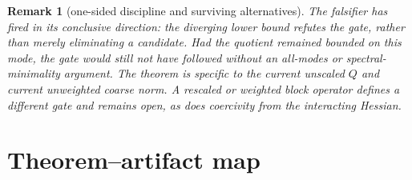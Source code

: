 \documentclass[11pt]{article}
\newtheorem{remark}[theorem]{Remark}
\theoremstyle{definition}
\begin{document}
\begin{remark}[one-sided discipline and surviving alternatives]
The falsifier has fired in its conclusive direction: the diverging lower
bound refutes the gate, rather than merely eliminating a candidate.  Had
the quotient remained bounded on this mode, the gate would still not
have followed without an all-modes or spectral-minimality argument.  The
theorem is specific to the current unscaled $Q$ and current unweighted
coarse norm.  A rescaled or weighted block operator defines a different
gate and remains open, as does coercivity from the interacting Hessian.
\end{remark}

\section{Theorem--artifact map}\label{sec:map}
\end{document}
